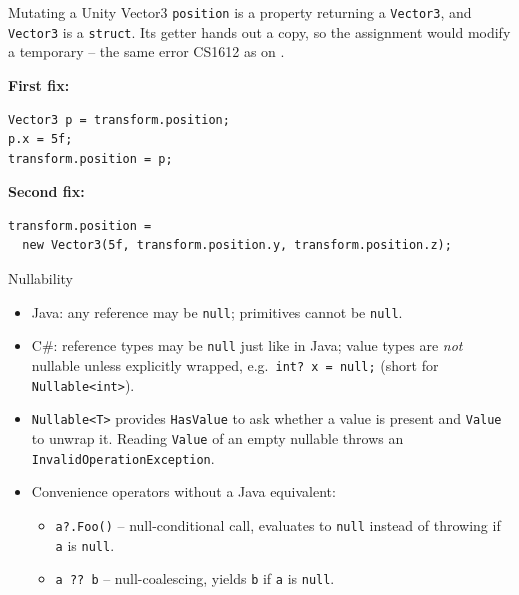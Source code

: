 \begin{solutionframe}{Mutating a Unity Vector3}
  \texttt{position} is a property returning a \texttt{Vector3}, and
  \texttt{Vector3} is a \texttt{struct}. Its getter hands out a copy, so the
  assignment would modify a temporary -- the same error CS1612 as on
  .
  \vspace{1ex}

\textbf{First fix:}\\
  \begin{lstlisting}[basicstyle=\scriptsize\ttfamily]
Vector3 p = transform.position;
p.x = 5f;
transform.position = p;
  \end{lstlisting}

  \textbf{Second fix:}\\
 \begin{lstlisting}[basicstyle=\scriptsize\ttfamily]
transform.position =
  new Vector3(5f, transform.position.y, transform.position.z);
  \end{lstlisting}
  \vspace{3ex}

\end{solutionframe}

\begin{frame}{Nullability}
  \begin{itemize}
    \item Java: any reference may be \texttt{null}; primitives cannot be
      \texttt{null}.
    \item C\#: reference types may be \texttt{null} just like in Java;
      value types are \emph{not} nullable unless explicitly wrapped,
      e.g.\ \texttt{int?\ x = null;} (short for \texttt{Nullable<int>}).
    \item \texttt{Nullable<T>} provides \texttt{HasValue} to ask whether a value
      is present and \texttt{Value} to unwrap it. Reading \texttt{Value} of an
      empty nullable throws an \texttt{InvalidOperationException}.
    \item Convenience operators without a Java equivalent:
      \begin{itemize}
        \item \texttt{a?.Foo()} -- null-conditional call, evaluates to
          \texttt{null} instead of throwing if \texttt{a} is \texttt{null}.
        \item \texttt{a ?? b} -- null-coalescing, yields \texttt{b} if
          \texttt{a} is \texttt{null}.
      \end{itemize}
  \end{itemize}
\end{frame}

